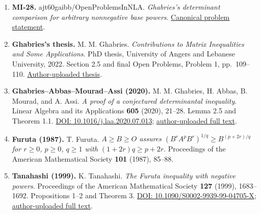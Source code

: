 \documentclass[10pt,a4paper]{article}
\begin{document}
\begin{enumerate}
\def\labelenumi{\arabic{enumi}.}
\item
  \textbf{MI-28.} ajt60gaibb/OpenProblemsInNLA. \emph{Ghabries's
  determinant comparison for arbitrary nonnegative base powers}.
  \href{https://github.com/ajt60gaibb/OpenProblemsInNLA/blob/main/matrix-inequalities-and-norms/MI-28/README.md}{Canonical
  problem statement}.
\item
  \textbf{Ghabries's thesis.} M. M. Ghabries. \emph{Contributions to
  Matrix Inequalities and Some Applications}. PhD thesis, University of
  Angers and Lebanese University, 2022. Section 2.5 and final Open
  Problems, Problem 1, pp.~109--110.
  \href{https://www.researchgate.net/publication/361793582_Contributions_to_Matrix_Inequalities_and_Some_Applications}{Author-uploaded
  thesis}.
\item
  \textbf{Ghabries--Abbas--Mourad--Assi (2020).} M. M. Ghabries, H.
  Abbas, B. Mourad, and A. Assi. \emph{A proof of a conjectured
  determinantal inequality}. Linear Algebra and its Applications
  \textbf{605} (2020), 21--28. Lemma 2.5 and Theorem 1.1.
  \href{https://doi.org/10.1016/j.laa.2020.07.013}{DOI:
  10.1016/j.laa.2020.07.013};
  \href{https://www.researchgate.net/publication/342908148_A_proof_of_a_conjectured_determinantal_inequality}{author-uploaded
  full text}.
\item
  \textbf{Furuta (1987).} T. Furuta. \emph{\(A\ge B\ge O\) assures
  \((B^rA^pB^r)^{1/q}\ge B^{(p+2r)/q}\) for \(r\ge0\), \(p\ge0\),
  \(q\ge1\) with \((1+2r)q\ge p+2r\)}. Proceedings of the American
  Mathematical Society \textbf{101} (1987), 85--88.
\item
  \textbf{Tanahashi (1999).} K. Tanahashi. \emph{The Furuta inequality
  with negative powers}. Proceedings of the American Mathematical
  Society \textbf{127} (1999), 1683--1692. Propositions 1--2 and Theorem
  3. \href{https://doi.org/10.1090/S0002-9939-99-04705-X}{DOI:
  10.1090/S0002-9939-99-04705-X};
  \href{https://www.researchgate.net/publication/255605812_The_Furuta_inequality_with_negative_powers}{author-uploaded
  full text}.
\end{enumerate}
\end{document}
